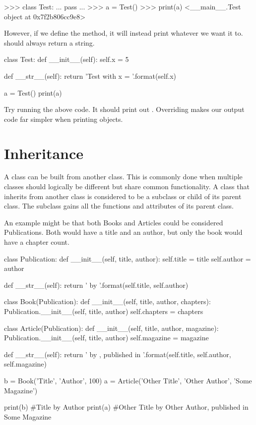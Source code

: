 \documentclass[11pt]{cselabheader}
\begin{document}
\begin{pyconcode}
>>> class Test:
...     pass
...
>>> a = Test()
>>> print(a)
<__main__.Test object at 0x7f2b806cc9e8>
\end{pyconcode}

However, if we define the method, it will instead print whatever we want it
to.  should always return a string.

\begin{python3code}
class Test:
    def __init__(self):
        self.x = 5

    def __str__(self):
        return 'Test with x = {}'.format(self.x)

a = Test()
print(a)
\end{python3code}

Try running the above code. It should print out .
Overriding  makes our output code far simpler when
printing objects.

\section{Inheritance}
\label{sec:inheritance}
A class can be built from another class. This is commonly done when multiple
classes should logically be different but share common functionality. A class
that inherits from another class is considered to be a subclass or child of
its parent class. The subclass gains all the functions and attributes of
its parent class.

An example
might be that both Books and Articles could be considered Publications. Both
would have a title and an author, but only the book would have a chapter count.

\begin{python3code}
class Publication:
    def __init__(self, title, author):
        self.title = title
        self.author = author

    def __str__(self):
        return '{} by {}'.format(self.title, self.author)

class Book(Publication):
    def __init__(self, title, author, chapters):
        Publication.__init__(self, title, author)
        self.chapters = chapters

class Article(Publication):
    def __init__(self, title, author, magazine):
        Publication.__init__(self, title, author)
        self.magazine = magazine

    def __str__(self):
        return '{} by {}, published in {}'.format(self.title, self.author,
            self.magazine)

b = Book('Title', 'Author', 100)
a = Article('Other Title', 'Other Author', 'Some Magazine')

print(b) #Title by Author
print(a) #Other Title by Other Author, published in Some Magazine
\end{python3code}
\end{document}

